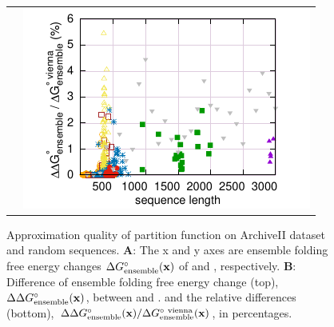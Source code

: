 \begin{figure}
\begin{tabular}{cc}
&\hspace{-2.4cm}\raisebox{2.6cm}{\panel{\color{white}C}}\hspace{-.3cm}\includegraphics[scale=0.79]{figs/ensemble_len_norm} \\[-0.4cm]
\end{tabular}
\caption{
  Approximation quality of partition function  on ArchiveII dataset and random sequences. %
  {\bf A}: The x and y axes are
  ensemble folding free energy changes $\Delta G^\circ_\text{ensemble}(\mathbf{x})$ of \viennarnafold %
  and \linearpartition, %
  respectively.
  {\bf B}: 
  Difference of ensemble folding free energy change (top), ${\Delta\Delta G^{\circ}_\text{ensemble}(\mathbf{x})}$, between \rnafold and \linearpartition.
  and the relative differences (bottom),  ${\Delta\Delta G^{\circ}_\text{ensemble}(\mathbf{x})}/{\Delta G^{\circ\ \text{vienna}}_\text{ensemble}(\mathbf{x})}$, in percentages.
  \label{fig:partition}
  \vspace{-0.2cm}
}
\end{figure}
